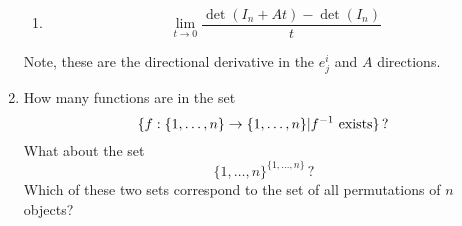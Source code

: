 \begin{enumerate}
\begin{enumerate}
\item \[
\lim_{t \rightarrow 0} \frac{\det(I_n + A t) - \det(I_n)}{t}
\]
\end{enumerate}
Note, these  are the directional derivative in the $e^i_j$ and $A$ directions.


\item How many functions are in the set $$\{ f:\{1,\dots,n\}\to \{1,\dots,n\} | f^{-1} {\rm ~exists} \}\, ?$$ What about the set $$\{1,\dots,n\}^{\{1,\dots,n\}}\, ?$$ Which of these two sets correspond to the set of all permutations of $n$ objects?


\end{enumerate}
